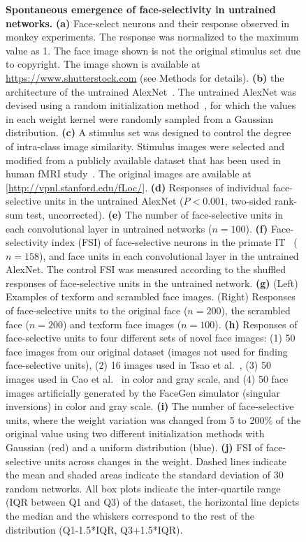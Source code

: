 \documentclass[sn-mathphys]{sn-jnl}%
\theoremstyle{thmstyleone}%
\theoremstyle{thmstyletwo}%
\theoremstyle{thmstylethree}%
\begin{document}
\begin{figure}[htbp]
	\centering
	\caption{
		\textbf{Spontaneous emergence of face-selectivity in untrained networks.
		}
		\textbf{(a)} Face-select neurons and their response observed in monkey experiments.
		The response was normalized to the maximum value as 1.
		The face image shown is not the original stimulus set due to copyright.
		The image shown is available at \url{https://www.shutterstock.com} (see Methods for details).
		\textbf{(b)} the architecture of the untrained AlexNet~\cite{krizhevsky2012imagenet}.
		The untrained AlexNet was devised using a random initialization method~\cite{lecun2012efficient}, for which the values in each weight kernel were randomly sampled from a Gaussian distribution.
		\textbf{(c)} A stimulus set was designed to control the degree of intra-class image similarity.
		Stimulus images were selected and modified from a publicly available dataset that has been used in human fMRI study~\cite{stigliani2015temporal}.
		The original images are available at [\url{http://vpnl.stanford.edu/fLoc/}].
		\textbf{(d)} Responses of individual face-selective units in the untrained AlexNet ($ P < 0.001 $, two-sided rank-sum test, uncorrected).
		\textbf{(e)} The number of face-selective units in each convolutional layer in untrained networks ($ n=100 $).
		\textbf{(f)} Face-selectivity index (FSI) of face-selective neurons in the primate IT~\cite{freiwald2010functional} ($ n=158 $), and face units in each convolutional layer in the untrained AlexNet.
		The control FSI was measured according to the shuffled responses of face-selective units in the untrained network.
		\textbf{(g)} (Left) Examples of texform and scrambled face images.
		(Right) Responses of face-selective units to the original face ($ n = 200 $), the scrambled face ($ n=200 $) and texform face images ($ n = 100 $).
		\textbf{(h)} Responses of face-selective units to four different sets of novel face images: 
		(1) 50 face images from our original dataset (images not used for finding face-selective units),
		(2) 16 images used in Tsao et al.~\cite{tsao2006cortical,freiwald2010functional},
		(3) 50 images used in Cao et al.~\cite{cao2018vggface2} in color and gray scale,
		and (4) 50 face images artificially generated by the FaceGen simulator (singular inversions) in color and gray scale. %
		\textbf{(i)} The number of face-selective units, where the weight variation was changed from 5 to 200\% of the original value using two different initialization methods with Gaussian (red) and a uniform distribution (blue).
		\textbf{(j)} FSI of face-selective units across changes in the weight.
		Dashed lines indicate the mean and shaded areas indicate the standard deviation of 30 random networks.
		All box plots indicate the inter-quartile range (IQR between Q1 and Q3) of the dataset,
		the horizontal line depicts the median and the whiskers correspond to the rest of the distribution (Q1-1.5*IQR, Q3+1.5*IQR).
	}
	\label{fig:emergence}
\end{figure}
\end{document}
